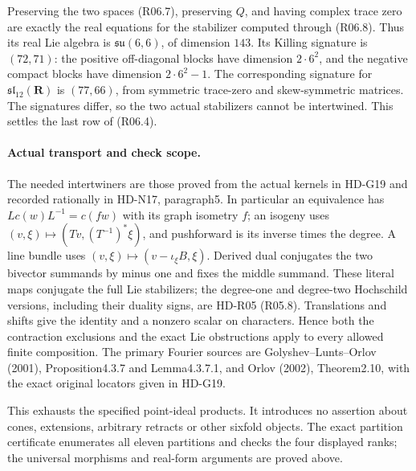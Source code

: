 Preserving the two spaces (R06.7), preserving $Q$, and having
complex trace zero are exactly the real equations for the
stabilizer computed through (R06.8). Thus its real Lie algebra is
$\mathfrak{su}(6,6)$, of dimension $143$. Its Killing signature
is $(72,71)$: the positive off-diagonal blocks have dimension
$2\cdot6^2$, and the negative compact blocks have dimension
$2\cdot6^2-1$. The corresponding signature for
$\mathfrak{sl}_{12}(\mathbf R)$ is $(77,66)$, from symmetric
trace-zero and skew-symmetric matrices. The signatures differ,
so the two actual stabilizers cannot be intertwined. This settles
the last row of (R06.4).

\paragraph{Actual transport and check scope.}
The needed intertwiners are those proved from the actual kernels
in HD-G19 and recorded rationally in HD-N17, paragraph5. In
particular an equivalence has
$Lc(w)L^{-1}=c(fw)$ with its graph isometry $f$; an isogeny
uses $(v,\xi)\mapsto(Tv,(T^{-1})^*\xi)$, and pushforward is
its inverse times the degree. A line bundle uses
$(v,\xi)\mapsto(v-\iota_\xi B,\xi)$. Derived dual conjugates
the two bivector summands by minus one and fixes the middle
summand. These literal maps conjugate the full Lie stabilizers;
the degree-one and degree-two Hochschild versions, including
their duality signs, are HD-R05 (R05.8). Translations and shifts
give the identity and a nonzero scalar on characters. Hence both
the contraction exclusions and the exact Lie obstructions apply
to every allowed finite composition. The primary Fourier sources
are Golyshev--Lunts--Orlov (2001), Proposition4.3.7 and
Lemma4.3.7.1, and Orlov (2002), Theorem2.10, with the exact
original locators given in HD-G19.

This exhausts the specified point-ideal products. It introduces
no assertion about cones, extensions, arbitrary retracts or other
sixfold objects. The exact partition certificate enumerates all
eleven partitions and checks the four displayed ranks; the
universal morphisms and real-form arguments are proved above.
